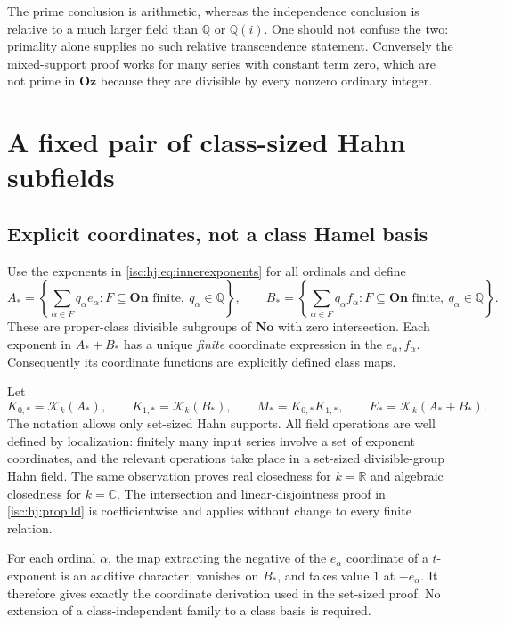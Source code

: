 \documentclass[11pt,letterpaper]{article}
\theoremstyle{definition}
\theoremstyle{remark}
\newcommand{\No}{\mathbf{No}}
\newcommand{\Oz}{\mathbf{Oz}}
\newcommand{\On}{\mathbf{On}}
\newcommand{\R}{\mathbb R}
\newcommand{\C}{\mathbb C}
\newcommand{\Q}{\mathbb Q}
\newcommand{\K}[2]{\mathcal K_{#1}(#2)}
\numberwithin{equation}{section}
\begin{document}
The prime conclusion is arithmetic, whereas the independence conclusion
is relative to a much larger field than $\Q$ or $\Q(i)$.
One should not confuse the two: primality alone supplies no such
relative transcendence statement. Conversely the mixed-support proof
works for many series with constant term zero, which are not prime in
$\Oz$ because they are divisible by every nonzero ordinary integer.

\section{A fixed pair of class-sized Hahn subfields}\label{isc:hj:sec:classes}

\subsection{Explicit coordinates, not a class Hamel basis}

Use the exponents in \eqref{isc:hj:eq:innerexponents} for all ordinals and
define
\[
 A_*=\left\{\sum_{\alpha\in F}q_\alpha e_\alpha:
                  F\subseteq\On\text{ finite},\ q_\alpha\in\Q\right\},
 \qquad
 B_*=\left\{\sum_{\alpha\in F}q_\alpha f_\alpha:
                  F\subseteq\On\text{ finite},\ q_\alpha\in\Q\right\}.
\]
These are proper-class divisible subgroups of $\No$ with zero
intersection. Each exponent in $A_*+B_*$ has a unique \emph{finite}
coordinate expression in the $e_\alpha,f_\alpha$. Consequently its
coordinate functions are explicitly defined class maps.

Let
\[
 K_{0,*}=\K{k}{A_*},\qquad K_{1,*}=\K{k}{B_*},\qquad
 M_*=K_{0,*}K_{1,*},\qquad E_*=\K{k}{A_*+B_*}.
\]
The notation allows only set-sized Hahn supports. All field operations
are well defined by localization: finitely many input series involve a
set of exponent coordinates, and the relevant operations take place in
a set-sized divisible-group Hahn field. The same observation proves real
closedness for $k=\R$ and algebraic closedness for $k=\C$.
The intersection and linear-disjointness proof in \cref{isc:hj:prop:ld} is
coefficientwise and applies without change to every finite relation.

For each ordinal $\alpha$, the map extracting the negative of the
$e_\alpha$ coordinate of a $t$-exponent is an additive character,
vanishes on $B_*$, and takes value $1$ at $-e_\alpha$.
It therefore gives exactly the coordinate derivation used in the
set-sized proof. No extension of a class-independent family to a class
basis is required.
\end{document}

